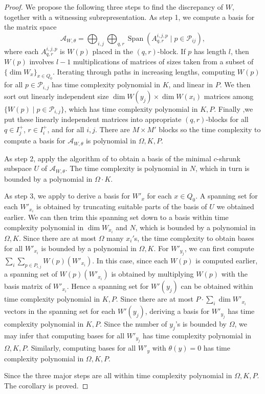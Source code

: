 \documentclass[a4paper]{amsart}
\numberwithin{equation}{section}
\theoremstyle{plain}
\theoremstyle{definition}
\DeclareMathOperator{\Span}{Span}
\begin{document}
\begin{proof}
We propose the following three steps to find the discrepancy of $W$, together with a witnessing subrepresentation. 
As step 1, we compute a basis for the matrix space $$\mathcal{A}_{W,\theta}=\bigoplus_{i,j}\bigoplus_{q,r}\Span(A^{i,j,p}_{q,r}\mid p\in\mathcal{P}_{ij}),$$ where each $A^{i,j,p}_{q,r}$ is $W(p)$ placed in the $(q,r)$-block. If $p$ has length $l$, then $W(p)$ involves $l-1$ multiplications of matrices of sizes taken from a subset of $\{\dim W_x\}_{x\in Q_0}$. Iterating through paths in increasing lengths, computing $W(p)$ for all $p\in\mathcal{P}_{i,j}$ has time complexity polynomial in $K$, and linear in $P$. We then sort out linearly independent size $\dim W(y_j)\times \dim W(x_i)$ matrices among $\{W(p)\mid p\in \mathcal{P}_{i,j}\}$, which has time complexity polynomial in $K,P$. Finally ,we put these linearly independent matrices into appropriate $(q,r)$-blocks for all $q\in I^{+}_{j}$, $r\in I^{+}_i$, and for all $i,j$. There are $M\times M'$ blocks so the time complexity to compute a basis for $\mathcal{A}_{W,\theta}$ is polynomial in $\Omega,K,P$. 

As step 2, apply the algorithm of  to obtain a basis of the minimal $c$-shrunk subspace $U$ of $\mathcal{A}_{W,\theta}$. The time complexity is polynomial in $N$, which in turn is bounded by a polynomial in $\Omega\cdot K$.

As step 3, we apply  to derive a basis for $W'_{x}$ for each $x\in Q_0$. A spanning set for each $W'_{x_i}$ is obtained by truncating suitable parts of the basis of $U$ we obtained earlier. We can then trim this spanning set down to a basis within time complexity polynomial in $\dim W_{x_i}$ and $N$, which is bounded by a polynomial in $\Omega,K$. Since there are at most $\Omega$ many $x_i'$s, the time complexity to obtain bases for all $W'_{x_i}$ is bounded by a polynomial in $\Omega,K$. For $W'_{y_j}$, we can first compute $\sum_{i}\sum_{p\in P_{i,j}}W(p)(W'_{x_i})$. In this case, since each $W(p)$ is computed earlier, a spanning set of $W(p)(W'_{x_i})$ is obtained by multiplying $W(p)$ with the basis matrix of $W'_{x_i}$. Hence a spanning set for $W'(y_j)$ can be obtained within time complexity polynomial in $K,P$. Since there are at most $P\cdot\sum_{i}\dim W'_{x_i}$ vectors in the spanning set for each $W'(y_j)$, deriving a basis for $W'_{y_{j}}$ has time complexity polynomial in $K,P$. Since the number of $y_{j}$'s is bounded by $\Omega$, we may infer that computing bases for all $W'_{y_j}$ has time complexity polynomial in $\Omega,K,P$. Similarly, computing bases for all $W'_{y}$ with $\theta(y)=0$ has time complexity polynomial in $\Omega,K,P$.

Since the three major steps are all within time complexity polynomial in $\Omega,K,P$. The corollary is proved.
\end{proof}
\end{document}

